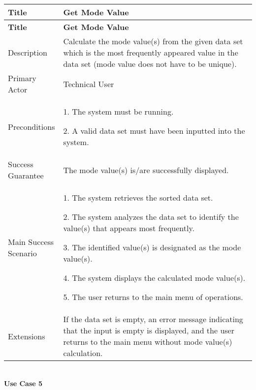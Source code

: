     \begin{longtable}{|p{0.227\linewidth}|p{0.773\linewidth}|}
    \hline
    \textbf{Title} & \textbf{Get Mode Value} \\
    \hline
    \endfirsthead
    \hline
    \textbf{Title} & \textbf{Get Mode Value} \\
    \hline
    \endhead
    \hline
    \endfoot
    \hline
    \endlastfoot
    Description & Calculate the mode value(s) from the given data set which
    is the most frequently appeared value in the data set (mode value does
    not have to be unique). \\ \hline
    Primary Actor & Technical User \\ \hline
    Preconditions & 1. The system must be running.
    
    2. A valid data set must have been inputted into the system. \\ \hline
    Success Guarantee & The mode value(s) is/are successfully displayed. \\ \hline
    Main Success Scenario & 1. The system retrieves the sorted data set.
    
    2. The system analyzes the data set to identify the value(s) that
    appears most frequently.
    
    3. The identified value(s) is designated as the mode value(s).
    
    4. The system displays the calculated mode value(s).
    
    5. The user returns to the main menu of operations. \\ \hline
    Extensions & If the data set is empty, an error message indicating that
    the input is empty is displayed, and the user returns to the main menu
    without mode value(s) calculation.
    \end{longtable}

    \strut \\
    \textbf{\large Use Case 5}
    
